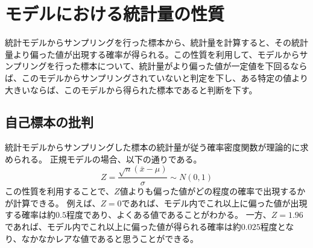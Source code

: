\chapter{モデルにおける統計量の性質}
統計モデルからサンプリングを行った標本から、統計量を計算すると、その統計量より偏った値が出現する確率が得られる。この性質を利用して、モデルからサンプリングを行った標本について、統計量がより偏った値が一定値を下回るならば、このモデルからサンプリングされていないと判定を下し、ある特定の値より大きいならば、このモデルから得られた標本であると判断を下す。



\section{自己標本の批判}
統計モデルからサンプリングした標本の統計量が従う確率密度関数が理論的に求められる。
正規モデルの場合、以下の通りである。
\begin{equation*}
    Z = \frac{\sqrt{n}(\bar{x}-\mu)}{\sigma} \sim N(0,1)
\end{equation*}
この性質を利用することで、$Z$値よりも偏った値がどの程度の確率で出現するかが計算できる。
例えば、$Z=0$であれば、モデル内でこれ以上に偏った値が出現する確率は約$0.5$程度であり、よくある値であることがわかる。
一方、$Z=1.96$であれば、モデル内でこれ以上に偏った値が得られる確率は約$0.025$程度となり、なかなかレアな値であると思うことができる。



